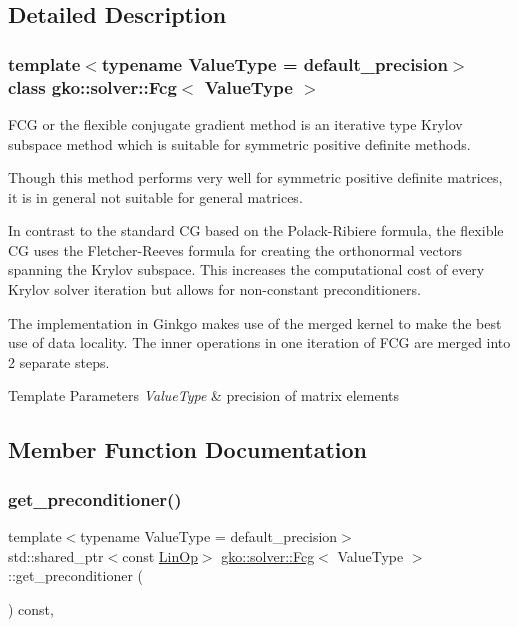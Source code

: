 \subsection{Detailed Description}
\subsubsection*{template$<$typename Value\+Type = default\+\_\+precision$>$\newline
class gko\+::solver\+::\+Fcg$<$ Value\+Type $>$}

F\+CG or the flexible conjugate gradient method is an iterative type Krylov subspace method which is suitable for symmetric positive definite methods. 

Though this method performs very well for symmetric positive definite matrices, it is in general not suitable for general matrices.

In contrast to the standard CG based on the Polack-\/\+Ribiere formula, the flexible CG uses the Fletcher-\/\+Reeves formula for creating the orthonormal vectors spanning the Krylov subspace. This increases the computational cost of every Krylov solver iteration but allows for non-\/constant preconditioners.

The implementation in Ginkgo makes use of the merged kernel to make the best use of data locality. The inner operations in one iteration of F\+CG are merged into 2 separate steps.


\begin{DoxyTemplParams}{Template Parameters}
{\em Value\+Type} & precision of matrix elements \\
\hline
\end{DoxyTemplParams}


\subsection{Member Function Documentation}
\mbox{\label{classgko_1_1solver_1_1Fcg_a2dec8d13548e8b316d6598c9ee8b0881}} 
\subsubsection{\texorpdfstring{get\+\_\+preconditioner()}{get\_preconditioner()}}
{\footnotesize\ttfamily template$<$typename Value\+Type  = default\+\_\+precision$>$ \\
std\+::shared\+\_\+ptr$<$const \hyperlink{classgko_1_1LinOp}{Lin\+Op}$>$ \hyperlink{classgko_1_1solver_1_1Fcg}{gko\+::solver\+::\+Fcg}$<$ Value\+Type $>$\+::get\+\_\+preconditioner (\begin{DoxyParamCaption}{ }\end{DoxyParamCaption}) const\hspace{0.3cm}{\ttfamily [override]}, {\ttfamily [virtual]}}



